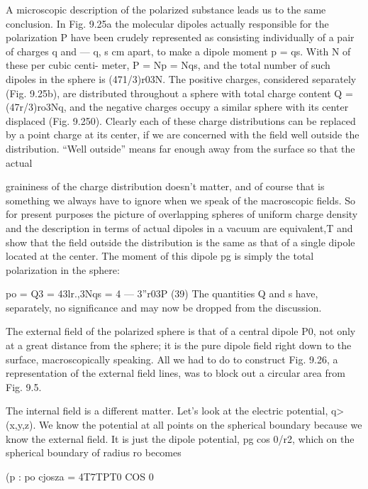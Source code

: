A microscopic description of the polarized substance leads us to
the same conclusion. In Fig. 9.25a the molecular dipoles actually
responsible for the polarization P have been crudely represented as
consisting individually of a pair of charges q and  --- q, s cm apart, to
make a dipole moment p = qs. With N of these per cubic centi-
meter, P = Np = Nqs, and the total number of such dipoles in the
sphere is (471/3)r03N. The positive charges, considered separately
(Fig. 9.25b), are distributed throughout a sphere with total charge
content Q = (47r/3)ro3Nq, and the negative charges occupy a similar
sphere with its center displaced (Fig. 9.250). Clearly each of these
charge distributions can be replaced by a point charge at its center,
if we are concerned with the field well outside the distribution. ``Well
outside'' means far enough away from the surface so that the actual

graininess of the charge distribution doesn't matter, and of course
that is something we always have to ignore when we speak of the
macroscopic fields. So for present purposes the picture of overlapping
spheres of uniform charge density and the description in
terms of actual dipoles in a vacuum are equivalent,T and show that
the field outside the distribution is the same as that of a single dipole
located at the center. The moment of this dipole pg is simply the
total polarization in the sphere:

\begin{equation}
\end{equation}
po = Q3 = 43lr.,3Nqs = 4 --- 3''r03P (39)
The quantities Q and s have, separately, no significance and may
now be dropped from the discussion.

The external field of the polarized sphere is that of a central
dipole P0, not only at a great distance from the sphere; it is the pure
dipole field right down to the surface, macroscopically speaking.
All we had to do to construct Fig. 9.26, a representation of the external
field lines, was to block out a circular area from Fig. 9.5.

The internal field is a different matter. Let's look at the electric
potential, q>(x,y,z). We know the potential at all points on the
spherical boundary because we know the external field. It is just
the dipole potential, pg cos 0/r2, which on the spherical boundary of
radius ro becomes

\begin{equation}
\end{equation}
(p : po cjosza = 4T7TPT0 COS 0 

